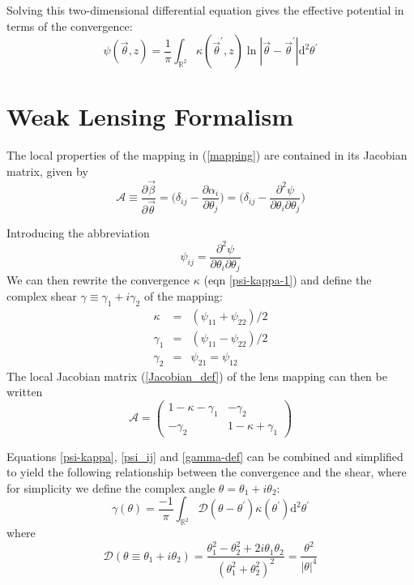 \documentclass[12pt,preprint]{aastex}			%
\newcommand{\dd}{\mathrm{d}} %
\begin{document}
Solving this two-dimensional differential equation gives the effective potential in terms of the convergence:
\begin{equation}
  \label{psi-kappa}
  \psi(\vec{\theta},z) 
  = \frac{1}{\pi}\int_{\mathbb{R}^2} \kappa(\vec{\theta}^\prime,z) 
  \ln|\vec{\theta} - \vec{\theta}^\prime|\dd^2\theta^\prime
\end{equation}

\section{Weak Lensing Formalism}
The local properties of the mapping in (\ref{mapping}) are contained in its Jacobian matrix, given by
\begin{equation}
  \label{Jacobian_def}
  \mathcal{A} \equiv \frac{\partial \vec{\beta}}{\partial \vec{\theta}} = \Big(\delta_{ij} - \frac{\partial \alpha_i}{\partial \theta_j} \Big) = \Big(\delta_{ij} - \frac{\partial^2 \psi}{\partial \theta_i \partial \theta_j} \Big)
\end{equation}

Introducing the abbreviation
\begin{equation}
  \label{psi_ij}
  \psi_{ij} = \frac{\partial^2 \psi}{\partial \theta_i \partial \theta_j}
\end{equation}
We can then rewrite the convergence $\kappa$ (eqn \ref{psi-kappa-1}) and define the complex shear $\gamma \equiv \gamma_1 + i\gamma_2$ of the mapping:
\begin{equation}
  \label{gamma-def}
  \begin{array}{lcl}
    \kappa & = & (\psi_{11} + \psi_{22})/2\\
    \gamma_1 & = & (\psi_{11} - \psi_{22})/2\\
    \gamma_2 & = & \psi_{21} = \psi_{12}
  \end{array}
\end{equation}
The local Jacobian matrix (\ref{Jacobian_def}) of the lens mapping can then be written
\begin{equation}
  \mathcal{A} = \left(
  \begin{array}{cc}
    1 - \kappa - \gamma_1 & -\gamma_2\\
    -\gamma_2             & 1-\kappa+\gamma_1
  \end{array}\right)
\end{equation}

Equations \ref{psi-kappa}, \ref{psi_ij} and \ref{gamma-def} can be combined and simplified to yield the following relationship between the convergence and the shear, where for simplicity we define the complex angle $\theta = \theta_1 + i\theta_2$:
\begin{equation}
  \label{gamma-kappa}
  \gamma(\theta) 
  = \frac{-1}{\pi}\int_{\mathbb{R}^2} \mathcal{D}(\theta - 
  \theta^\prime)\kappa(\theta^\prime) \dd^2\theta^\prime
\end{equation}
where 
\begin{equation}
  \label{scriptD}
  \mathcal{D}(\theta \equiv \theta_1+i\theta_2) 
  = \frac{\theta_1^2 - \theta_2^2 + 2i\theta_1\theta_2}{(\theta_1^2+\theta_2^2)^2}
  = \frac{\theta^2}{|\theta|^4}
\end{equation}
\end{document}
